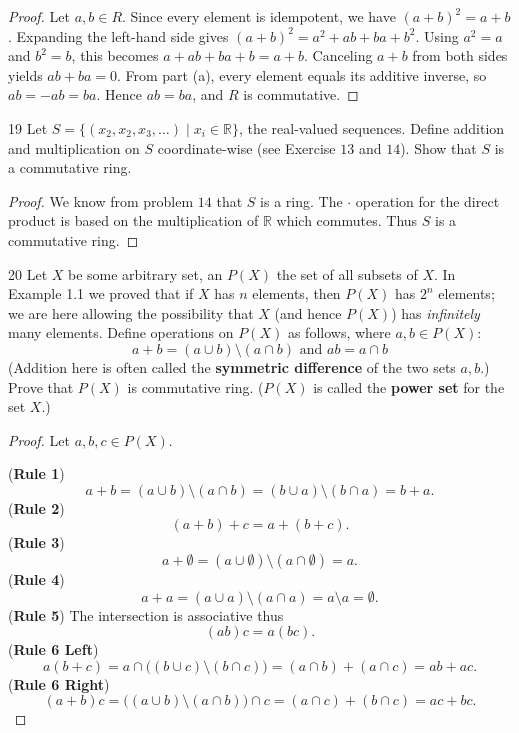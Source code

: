 \begin{proof}
    Let $a,b \in R$.
    Since every element is idempotent, we have $(a + b)^2 = a + b$.
    Expanding the left-hand side gives $(a + b)^2 = a^2 + ab + ba + b^2$.
    Using $a^2 = a$ and $b^2 = b$, this becomes $a + ab + ba + b = a + b$.
    Canceling $a + b$ from both sides yields $ab + ba = 0$.
    From part (a), every element equals its additive inverse, so $ab = -ab = ba$.
    Hence $ab = ba$, and $R$ is commutative.
\end{proof}

\begin{problem}{19}
    Let $S = \{(x_2, x_2, x_3, \ldots) \mid x_i \in \mathbb{R}\}$,
    the real-valued sequences. Define addition and multiplication 
    on $S$ coordinate-wise (see Exercise $13$ and $14$). Show that 
    $S$ is a commutative ring.
\end{problem}
\solved

\begin{proof}
    We know from problem $14$ that $S$ is a ring.
    The $\cdot$ operation for the direct product is based 
        on the multiplication of $\mathbb{R}$ which commutes.
    Thus $S$ is a commutative ring.
\end{proof}

\begin{problem}{20}
    Let $X$ be some arbitrary set, an $P(X)$ the 
    set of all subsets of $X$.
    In Example 1.1 we proved that if $X$ has $n$
    elements, then $P(X)$ has $2^n$ elements;
    we are here allowing the possibility that $X$
    (and hence $P(X)$) has \emph{infinitely} many 
    elements. Define operations on 
    $P(X)$ as follows, where $a, b \in P(X)$:
    \[a + b = (a \cup b) \setminus (a \cap b) \text{ and } ab = a \cap b\]
    (Addition here is often called the 
    \textbf{symmetric difference} of the two sets $a, b$.)
    Prove that $P(X)$ is commutative ring.
    ($P(X)$ is called the \textbf{power set} for the set $X$.)
\end{problem}
\solved

\begin{proof}
    Let $a, b, c \in P(X)$.

    (\textbf{Rule 1}) 
    \[
    a + b = (a \cup b) \setminus (a \cap b)
          = (b \cup a) \setminus (b \cap a)
          = b + a.
    \]
    (\textbf{Rule 2})
    \[
    (a + b) + c = a + (b + c).
    \]
    (\textbf{Rule 3})
    \[
    a + \emptyset = (a \cup \emptyset) \setminus (a \cap \emptyset) = a.
    \]
    (\textbf{Rule 4})
    \[
    a + a = (a \cup a) \setminus (a \cap a) = a \setminus a = \emptyset.
    \]
    (\textbf{Rule 5})
    The intersection is associative thus
    \[
    (ab)c = a(bc).
    \]
    (\textbf{Rule 6 Left}) 
    \[
    a(b + c) = a \cap \bigl((b \cup c) \setminus (b \cap c)\bigr)
             = (a \cap b) + (a \cap c)
             = ab + ac.
    \]
    (\textbf{Rule 6 Right}) 
    \[
    (a + b)c = \bigl((a \cup b) \setminus (a \cap b)\bigr) \cap c
             = (a \cap c) + (b \cap c)
             = ac + bc.
    \]
\end{proof}

